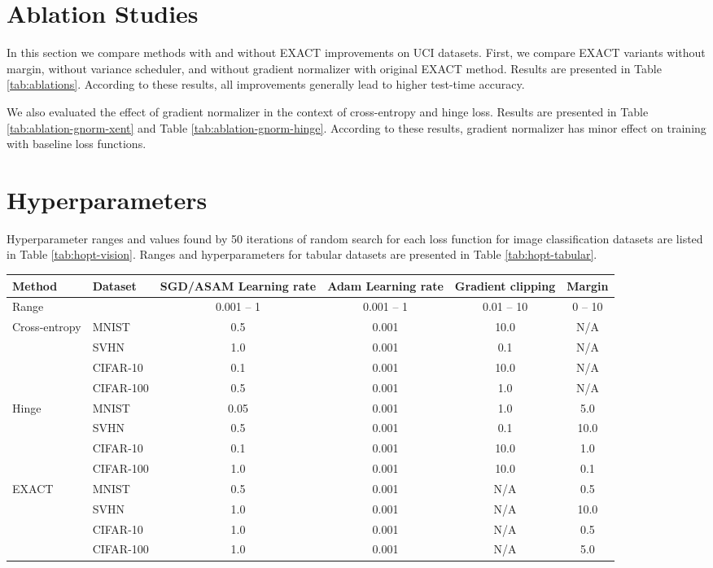 \documentclass[nohyperref]{article}
\theoremstyle{plain}
\theoremstyle{definition}
\theoremstyle{remark}
\begin{document}
\section{Ablation Studies}
In this section we compare methods with and without \mbox{EXACT} improvements on UCI datasets. First, we compare EXACT variants without margin, without variance scheduler, and without gradient normalizer with original EXACT method. Results are presented in Table \ref{tab:ablations}. According to these results, all improvements generally lead to higher test-time accuracy.

We also evaluated the effect of gradient normalizer in the context of cross-entropy and hinge loss. Results are presented in Table \ref{tab:ablation-gnorm-xent} and Table \ref{tab:ablation-gnorm-hinge}. According to these results, gradient normalizer has minor effect on training with baseline loss functions.

\section{Hyperparameters}

Hyperparameter ranges and values found by 50 iterations of random search for each loss function for image classification datasets are listed in Table \ref{tab:hopt-vision}. Ranges and hyperparameters for tabular datasets are presented in Table \ref{tab:hopt-tabular}.
\begin{table*}[t]
\centering
\begin{tabular}{l|l|cccc}
Method & Dataset & SGD/ASAM Learning rate & Adam Learning rate & Gradient clipping & Margin \\
\hline
Range & & 0.001 -- 1 & 0.001 -- 1 & 0.01 -- 10 & 0 -- 10 \\
\hline
\multirow{3}{*}{Cross-entropy}
& MNIST & 0.5 & 0.001 & 10.0 & N/A \\
& SVHN & 1.0 & 0.001 & 0.1 & N/A \\
& CIFAR-10 & 0.1 & 0.001 & 10.0 & N/A \\
& CIFAR-100 & 0.5 & 0.001 & 1.0 & N/A \\
\hline
\multirow{3}{*}{Hinge}
& MNIST & 0.05 & 0.001 & 1.0 & 5.0 \\
& SVHN & 0.5 & 0.001 & 0.1 & 10.0 \\
& CIFAR-10 & 0.1 & 0.001 & 10.0 & 1.0 \\
& CIFAR-100 & 1.0 & 0.001 & 10.0 & 0.1 \\
\hline
\multirow{3}{*}{EXACT}
& MNIST & 0.5 & 0.001 & N/A & 0.5 \\
& SVHN & 1.0 & 0.001 & N/A & 10.0 \\
& CIFAR-10 & 1.0 & 0.001 & N/A & 0.5 \\
& CIFAR-100 & 1.0 & 0.001 & N/A & 5.0 \\
\end{tabular}

\caption{Hyperparameters for vision classification datasets.}
\label{tab:hopt-vision}
\end{table*}
\end{document}
